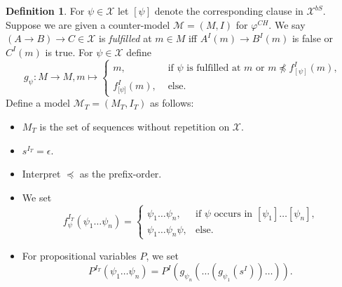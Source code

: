 \documentclass{easychair}
\theoremstyle{definition}
\theoremstyle{definition}
\theoremstyle{definition}
\theoremstyle{definition}
\theoremstyle{definition}
\newtheorem{definition}[theorem]{Definition}
\theoremstyle{definition}
\theoremstyle{definition}
\begin{document}
\begin{definition}
For $\psi\in\mathcal X$ let $[\psi]$ denote the corresponding clause in $\mathcal X^{b S}$. Suppose we are given a counter-model $\mathcal M = (M, I)$ for $\varphi^{CH}$.
We say $(A\to B)\to C\in\mathcal X$ is \emph{fulfilled} at $m\in M$ iff $A^I(m)\to B^I(m)$ is false or $C^I(m)$ is true. For $\psi\in\mathcal X$ define $$g_\psi : M\to M, m\mapsto\begin{cases}
		m,&\text{ if $\psi$ is fulfilled at $m$ or $m\not\preceq f^I_{[\psi]}(m)$,}\\
		f^I_{\lbrack\psi\rbrack}(m),&\text{ else.}		
	\end{cases}$$Define a model $\mathcal M_T = (M_T, I_T)$ as follows:
	\begin{itemize}
		\item $M_T$ is the set of sequences without repetition on $\mathcal X$.
		\item $s^{I_T} = \epsilon$.
		\item Interpret $\preceq$ as the prefix-order.
		\item We set $$f_\psi^{I_T}(\psi_1\dots\psi_n) = \begin{cases}
			\psi_1\dots\psi_n, &\text{if $\psi$ occurs in $[\psi_1]\dots[\psi_n]$,}\\
			\psi_1\dots\psi_n\psi, &\text{else.}			
		\end{cases}$$
		\item For propositional variables $P$, we set $$P^{I_T}\left(\psi_1\dots \psi_n\right) = P^I\left(g_{\psi_n}\left(\dots\left(g_{\psi_1}\left(s^I\right)\right)\dots\right)\right).$$
	\end{itemize}
\end{definition}
\end{document}

